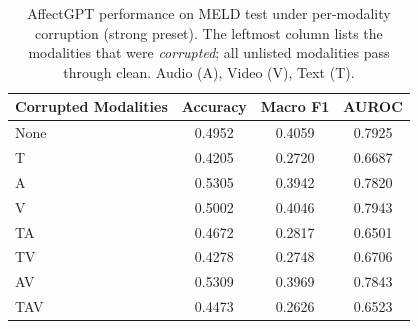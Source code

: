 \begin{table}[htbp]
\centering
\caption{AffectGPT performance on MELD test under per-modality corruption (strong preset). The leftmost column lists the modalities that were \emph{corrupted}; all unlisted modalities pass through clean. Audio (A), Video (V), Text (T).}
\label{tab:modality-results}
\begin{tabular}{lccc}
\toprule
\textbf{Corrupted Modalities} & \textbf{Accuracy} & \textbf{Macro F1} & \textbf{AUROC} \\
\midrule
None     & 0.4952 & 0.4059 & 0.7925 \\
T        & 0.4205 & 0.2720 & 0.6687 \\
A        & 0.5305 & 0.3942 & 0.7820 \\
V        & 0.5002 & 0.4046 & 0.7943 \\
TA       & 0.4672 & 0.2817 & 0.6501 \\
TV       & 0.4278 & 0.2748 & 0.6706 \\
AV       & 0.5309 & 0.3969 & 0.7843 \\
TAV      & 0.4473 & 0.2626 & 0.6523 \\
\bottomrule
\end{tabular}
\end{table}
